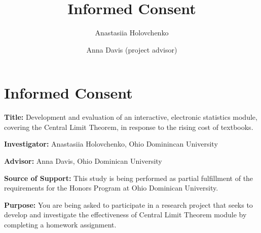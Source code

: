 \documentclass{ximera}
\author{Anastasiia Holovchenko \and Anna Davis (project advisor)} \title{Informed Consent}
\begin{document}
\begin{abstract}
\end{abstract}
\maketitle

\section{Informed Consent}
{\bf Title:} Development and evaluation of an interactive, electronic statistics module, covering the Central Limit Theorem, in response to the rising cost of textbooks.

{\bf Investigator:} Anastasiia Holovchenko, Ohio Dominincan University

{\bf Advisor:} Anna Davis, Ohio Dominican University

{\bf Source of Support:} This study is being performed as partial fulfillment of the requirements for the Honors Program at Ohio Dominican University.

{\bf Purpose:} You are being asked to participate in a research project that seeks to develop and investigate the effectiveness of Central Limit Theorem module by completing a homework assignment.
\end{document}
